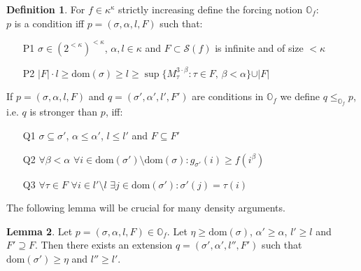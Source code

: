 \documentclass[12pt,a4paper]{scrartcl}
\theoremstyle{definition}
\newtheorem{definition}{Definition}[section]
\newtheorem{lemma}[definition]{Lemma}
\numberwithin{equation}{section}
\begin{document}
\begin{definition}
For $f \in \kappa^\kappa$ strictly increasing define the forcing notion $\mathbb{O}_f$:\\
$p$ is a condition iff $p=(\sigma, \alpha, l, F)$ such that:
\begin{itemize}
\item [P1] $\sigma \in (2^{< \kappa})^{<\kappa}$, $\alpha, l \in \kappa$ and $F \subset \mathcal{S}(f)$ is infinite and of size $< \kappa$
\item [P2] $\vert F \vert \cdot l \geq \text{dom}( \sigma ) \geq l \geq \sup\{M_\tau^{3 \cdot \beta} \colon \tau \in F, \, \beta < \alpha\} \cup \vert F \vert$
\end{itemize}
If $p=(\sigma, \alpha, l, F)$ and $q=(\sigma', \alpha', l', F')$ are conditions in $\mathbb{O}_f$ we define $q \leq_{\mathbb{O}_f} p$, i.e. $q$ is stronger than $p$, iff:
\begin{itemize}
\item [Q1] $\sigma \subseteq \sigma'$, $\alpha \leq \alpha'$, $l \leq l'$ and $F \subseteq F'$
\item [Q2] $\forall \beta < \alpha \,\, \forall i \in \text{dom}(\sigma') \setminus \text{dom}(\sigma) \colon g_{\sigma'}(i) \geq f(i^\beta)$
\item [Q3] $\forall \tau \in F \,\, \forall i \in l' \setminus l \,\, \exists j \in \text{dom}(\sigma') \colon \sigma'(j)=\tau(i)$
\end{itemize}
\end{definition}

The following lemma will be crucial for many density arguments.

\begin{lemma} \label{L3}
Let $p= (\sigma, \alpha, l, F) \in \mathbb{O}_f$. Let $\eta \geq \text{dom}(\sigma)$, $\alpha' \geq \alpha$, $l' \geq l $ and $F' \supseteq F$. Then there exists an extension $q=(\sigma', \alpha', l'',F')$ such that $\text{dom}(\sigma') \geq \eta$ and $l'' \geq l'$.
\end{lemma}
\end{document}
